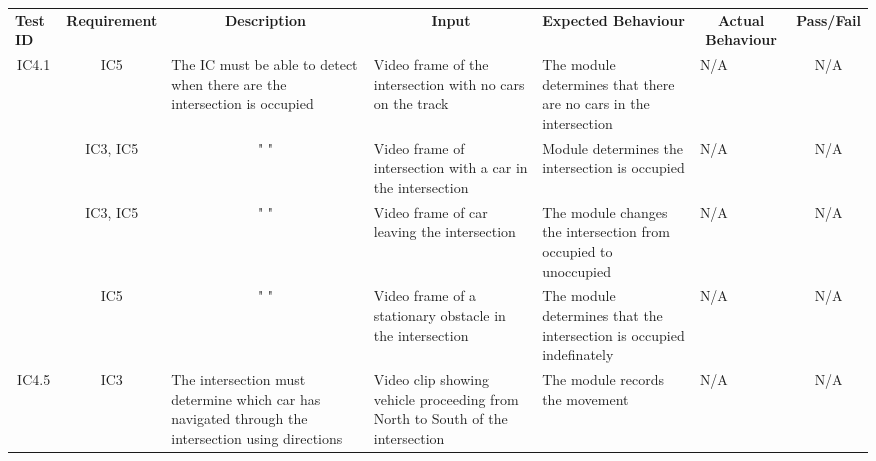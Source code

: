 \documentclass [10pt]{article}
\begin{document}
    
  \begin{longtable}{ | p{ } | p{ } |  p{ } |  p{ } | p{ } | p{ } |  p{ } |}  \hline

    \rowcolor{subsectionC}\textbf{Test ID}
    & \multicolumn{1}{c|}{\textbf{Requirement} }
    &\multicolumn{1}{c|}{\textbf{Description} }
    & \multicolumn{1}{c|}{\textbf{Input} }
    & \textbf{Expected Behaviour} 
    & \multicolumn{1}{c|}{\textbf{Actual Behaviour} }
    & \multicolumn{1}{c|}{\textbf{Pass/Fail}} \\  
    
    \multicolumn{1}{|c|}{IC4.1} 
    &\multicolumn{1}{c|}{IC5}  
    & The IC must be able to detect when there are the intersection is occupied
    & Video frame of the intersection with no cars on the track
    & The module determines that there are no cars in the intersection  
    & N/A
    &\multicolumn{1}{c|}{N/A}\\ 
    
    \rowcolor{tableCell}\multicolumn{1}{|c|}{IC4.2} 
    &\multicolumn{1}{c|}{IC3, IC5} 
    & \multicolumn{1}{c|}{" "} 
    & Video frame of intersection with a car in the intersection
    & Module determines the intersection is occupied
    & N/A
    & \multicolumn{1}{c|}{N/A}\\ \hline
    
    \newpage\hline
    
    \multicolumn{1}{|c|}{IC4.3} 
    &\multicolumn{1}{c|}{IC3, IC5}
    & \multicolumn{1}{c|}{" "} 
    & Video frame of car leaving the intersection
    & The module changes the intersection from occupied to unoccupied
    & N/A
    & \multicolumn{1}{c|}{N/A}\\ 
    
    \rowcolor{tableCell}\multicolumn{1}{|c|}{IC4.4} 
        &\multicolumn{1}{c|}{IC5}  
    &\multicolumn{1}{c|}{" "} 
    & Video frame of a stationary obstacle in the intersection
    & The module determines that the intersection is occupied indefinately
    & N/A
    & \multicolumn{1}{c|}{N/A}\\ 
    
    \multicolumn{1}{|c|}{IC4.5} 
    &\multicolumn{1}{c|}{IC3}
    & The intersection must determine which car has navigated through the intersection using directions
    & Video clip showing vehicle proceeding from North to South of the intersection
    & The module records the movement 
    & N/A
    & \multicolumn{1}{c|}{N/A} \\
    

\end{longtable}
\end{document}
